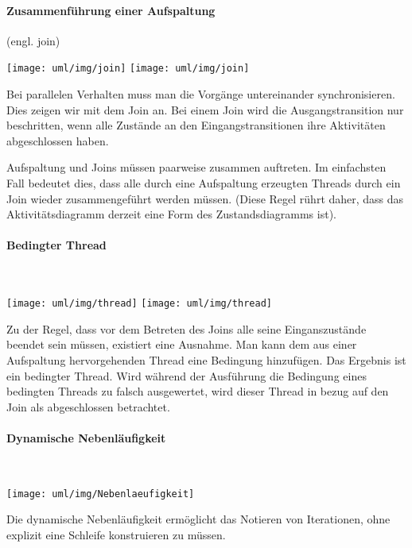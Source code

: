 \begin{minipage}[c]{0.45\linewidth}
\paragraph{Zusammenf\"uhrung einer Aufspaltung} (engl. join)\\[2ex]
\begin{minipage}[c]{0.29\linewidth}
\ifslides
\texttt{[image: uml/img/join]}
\else
\texttt{[image: uml/img/join]}
\fi
\end{minipage}
\begin{minipage}[c]{0.7\linewidth}
Bei parallelen Verhalten muss man die Vorg\"ange untereinander
synchronisieren. Dies zeigen wir
mit dem Join an. Bei einem Join wird die Ausgangstransition nur
beschritten, wenn alle Zust\"ande
an den Eingangstransitionen ihre Aktivit\"aten abgeschlossen haben.
\end{minipage}

Aufspaltung und Joins m\"ussen paarweise zusammen auftreten.
Im einfachsten Fall bedeutet dies,
dass alle durch eine Aufspaltung erzeugten Threads durch ein
Join wieder zusammengef\"uhrt werden
m\"ussen. (Diese Regel r\"uhrt daher, dass das Aktivit\"atsdiagramm
derzeit eine Form des
Zustandsdiagramms ist).
%
\ifslides
\newpage
\fi
\paragraph{Bedingter Thread}\ \\[2ex]
\begin{minipage}[c]{0.49\linewidth}
\ifslides
\texttt{[image: uml/img/thread]}
\else
\texttt{[image: uml/img/thread]}
\fi
\end{minipage}
\begin{minipage}[c]{0.5\linewidth}
Zu der Regel, dass vor dem Betreten des Joins alle seine
Einganszust\"ande beendet sein m\"ussen,
existiert eine Ausnahme. Man kann dem aus einer Aufspaltung
hervorgehenden Thread eine Bedingung
hinzuf\"ugen. Das Ergebnis ist ein bedingter Thread. Wird
w\"ahrend der Ausf\"uhrung die Bedingung
eines bedingten Threads zu falsch ausgewertet, wird dieser
Thread in bezug auf den Join als
abgeschlossen betrachtet.
\end{minipage}
%
\ifslides
\newpage
\fi
\paragraph{Dynamische Nebenl\"aufigkeit}\ \\[2ex]
\begin{minipage}[c]{0.29\linewidth}
\texttt{[image: uml/img/Nebenlaeufigkeit]}
\end{minipage}
\begin{minipage}[c]{0.7\linewidth}
Die dynamische Nebenl\"aufigkeit erm\"oglicht das Notieren von
Iterationen, ohne explizit eine
Schleife konstruieren zu m\"ussen.
\end{minipage}
%

\end{minipage}
